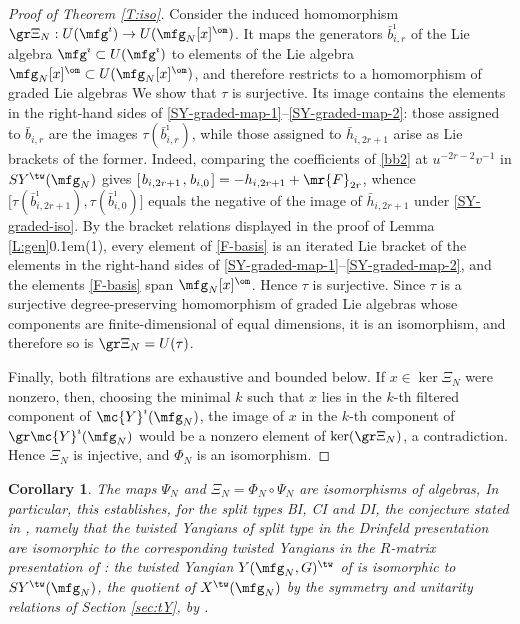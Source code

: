 \documentclass{amsart}
\newtheorem{crl}[theorem]{Corollary}
\numberwithin{equation}{section}
\theoremstyle{remark}
\renewcommand{\,}{\kern 0.1em} %
\begin{document}
\begin{proof}[Proof of Theorem \ref{T:iso}]
Consider the induced homomorphism $\gr \Xi_N : U(\mfg^{\imath}) \to U(\mfg_N[x]^{\om})$. It maps the generators $\bar b^{\imath}_{i,r}$ of the Lie algebra $\mfg^{\imath} \subset U(\mfg^{\imath})$ to elements of the Lie algebra $\mfg_N[x]^{\om} \subset U(\mfg_N[x]^{\om})$, and therefore restricts to a homomorphism of graded Lie algebras
We show that $\tau$ is surjective. Its image contains the elements in the right-hand sides of \eqref{SY-graded-map-1}--\eqref{SY-graded-map-2}: those assigned to $\bar b_{i,r}$ are the images $\tau(\bar b^{\imath}_{i,r})$, while those assigned to $\bar h_{i,2r+1}$ arise as Lie brackets of the former. Indeed, comparing the coefficients of \eqref{bb2} at $u^{-2r-2}v^{-1}$ in $SY^{\tw}(\mfg_N)$ gives $[\,b_{i,2r+1}\,,\,b_{i,0}\,] = - h_{i,2r+1} + \mr{F}_{2r}$, whence $\big[\tau(\bar b^{\imath}_{i,2r+1}), \tau(\bar b^{\imath}_{i,0})\big]$ equals the negative of the image of $\bar h_{i,2r+1}$ under \eqref{SY-graded-iso}. By the bracket relations displayed in the proof of Lemma \ref{L:gen}\,(1), every element of \eqref{F-basis} is an iterated Lie bracket of the elements in the right-hand sides of \eqref{SY-graded-map-1}--\eqref{SY-graded-map-2}, and the elements \eqref{F-basis} span $\mfg_N[x]^{\om}$. Hence $\tau$ is surjective. Since $\tau$ is a surjective degree-preserving homomorphism of graded Lie algebras whose components are finite-dimensional of equal dimensions, it is an isomorphism, and therefore so is $\gr\Xi_N = U(\tau)$.

Finally, both filtrations are exhaustive and bounded below. If $x \in \ker\Xi_N$ were nonzero, then, choosing the minimal $k$ such that $x$ lies in the $k$-th filtered component of $\mc{Y}^{\imath}(\mfg_N)$, the image of $x$ in the $k$-th component of $\gr\mc{Y}^{\imath}(\mfg_N)$ would be a nonzero element of $\ker(\gr\Xi_N)$, a contradiction. Hence $\Xi_N$ is injective, and $\Phi_N$ is an isomorphism.
%
\end{proof}


\begin{crl} \label{C:LWZ}
%
The maps $\Psi_N$ and $\Xi_N = \Phi_N \circ \Psi_N$ are isomorphisms of algebras,
In particular, this establishes, for the split types BI, CI and DI, the conjecture stated in \cite[\S1.4]{LWZ25b}, namely that the twisted Yangians of split type in the Drinfeld presentation are isomorphic to the corresponding twisted Yangians in the $R$-matrix presentation of \cite{GR16}: the twisted Yangian $Y(\mfg_N,G)^{\tw}$ of \cite{GR16} is isomorphic to $SY^{\tw}(\mfg_N)$, the quotient of $X^{\tw}(\mfg_N)$ by the symmetry and unitarity relations of Section \ref{sec:tY}, by \cite[Thm.~4.1, Cor.~5.2]{GR16}.
%
\end{crl}
\end{document}
